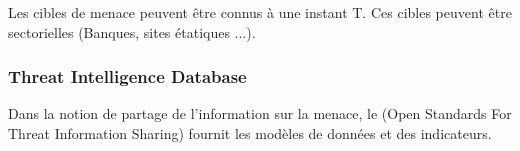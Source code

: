 Les cibles de menace peuvent être connus à une instant T. Ces cibles peuvent être  sectorielles (Banques, sites étatiques ...).


\subsubsection{Threat Intelligence Database }

Dans la notion de partage de l'information sur la menace, le  (Open Standards For Threat Information Sharing) fournit les modèles de données et des indicateurs.






